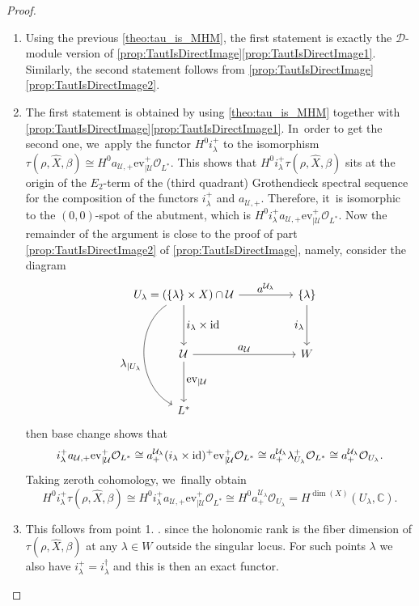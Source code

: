 \documentclass[JEP,XML,SOM,Unicode,published]{cedram}
\let\mathds\mathbb
\let\ts\textstyle
\newcommand{\ev}{\mathrm{ev}}
\newcommand{\dC}{{\mathds C}}\let\C\dC
\newcommand{\cO}{\mathcal{O}}\let\O\cO
\newcommand{\cU}{\mathcal{U}}\let\mcu\cU
\DeclareMathOperator{\id}{\textup{id}}
\begin{document}
\skpt
\begin{proof}
\begin{enumerate}
\item
Using the previous \cref{theo:tau_is_MHM}, the first statement is exactly the $\mathscr{D}$\nobreakdash-mod\-ule version of \cref{prop:TautIsDirectImage}\eqref{prop:TautIsDirectImage1}. Similarly,
the second statement follows from \cref{prop:TautIsDirectImage}\eqref{prop:TautIsDirectImage2}.
\item
The first statement is obtained by using \cref{theo:tau_is_MHM} together with \cref{prop:TautIsDirectImage}\eqref{prop:TautIsDirectImage1}. In~order to get the second one, we~apply the functor $H^0i_\lambda^+$ to the isomorphism $\tau(\rho,\hat X, \beta) \cong H^0 a_{\cU,+} {\ev_{|\cU}^+}\cO_{L^*}$. This shows that $H^0 i_\lambda^+ \tau(\rho,\hat X, \beta)$ sits at the origin of the $E_2$-term of the (third quadrant) Grothendieck spectral sequence for the composition of the functors $i_\lambda^+$ and $a_{\cU,+}$. Therefore, it~is isomorphic to the $(0,0)$-spot of the abutment, which is $
H^0 i_\lambda^+ a_{\cU,+} {\ev_{|\cU}^+}\cO_{L^*}$. Now the remainder of the argument is close to the proof of part \eqref{prop:TautIsDirectImage2} of \cref{prop:TautIsDirectImage}, namely,
consider the diagram
\[
\begin{tikzcd}
U_\lambda=(\{\lambda\}\times X)\cap\mathcal{U} \ar{rr}{\ts a^{\cU_\lambda}} \ar{dd}{\ts i_\lambda\times \textup{id}} \ar[bend right=60, swap]{dddd}{\ts \lambda_{|U_\lambda}}&& \{\lambda\} \ar[swap]{dd}{\ts i_\lambda} \\ \\
\mathcal{U} \ar{dd}{\ts \ev_{|\mathcal{U}}}
\ar{rr}{\ts a_{\mathcal{U}}}&& W \\ \\L^*
\end{tikzcd}
\]
then base change shows that
\[
i_\lambda^+ a_{\cU,+} {\ev_{|\cU}^+}\cO_{L^*}\cong a^{\cU_\lambda}_+(i_\lambda\times \id)^+
{\ev_{|\cU}^+}\cO_{L^*} \cong a^{\cU_\lambda}_+ \lambda_{U_\lambda}^+\cO_{L^*} \cong a^{\cU_\lambda}_+ \cO_{U_\lambda}.
\]
Taking zeroth cohomology, we~finally obtain
\[
H^0 i_\lambda^+ \tau(\rho,\hat X, \beta) \cong H^0 i_\lambda^+ a_{\cU,+} {\ev_{|\cU}^+}\cO_{L^*}
\cong
H^0 a^{\cU_\lambda}_+ \cO_{U_\lambda}
= H^{\dim(X)}(U_\lambda,\dC).
\]
\item
This follows from point 1. . since the holonomic rank is the fiber dimension
of $\tau(\rho,\hat{X},\beta)$ at any $\lambda\in W$ outside the singular locus. For such points $\lambda$ we also have $i_\lambda^+=i_\lambda^\dag$ and this is then an exact functor.\qedhere
\end{enumerate}
\end{proof}

\backmatter


\end{document}
